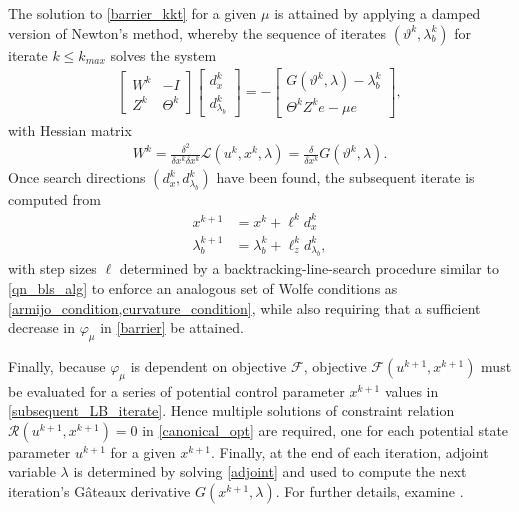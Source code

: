 The solution to \cref{barrier_kkt} for a given $\mu$ is attained by applying a damped version of  Newton's method, whereby the sequence of iterates $(\vartheta^k, \lambda_b^k)$ for iterate $k \leq k_{max}$ solves the system
\begin{align}
  \begin{bmatrix}
   W^k   & - I \\
   Z^k   &   \varTheta^k
  \end{bmatrix}
  \begin{bmatrix}
    d_{x}^k \\
    d_{\lambda_b}^k
  \end{bmatrix} = - 
  \begin{bmatrix}
    G(\vartheta^k,\lambda) - \lambda_b^k \\
    \varTheta^k Z^k e - \mu e
  \end{bmatrix},
\end{align}
with Hessian matrix 
\begin{align}
  W^k = \frac{\delta^2}{\delta x^k \delta x^k} \mathscr{L}(u^k, x^k, \lambda) = \frac{\delta}{\delta x^k} G(\vartheta^k,\lambda).
\end{align}
Once search directions $(d_{x}^k, d_{\lambda_b}^k)$ have been found, the subsequent iterate is computed from
\begin{align}
  \label{subsequent_LB_iterate}
  x^{k+1} &= x^k + \ell^k d_{x}^k \\
  \lambda_b^{k+1} &= \lambda_b^k + \ell_z^k d_{\lambda_b}^k,
\end{align}
with step sizes $\ell$ determined by a backtracking-line-search procedure similar to \cref{qn_bls_alg} to enforce an analogous set of Wolfe conditions as \cref{armijo_condition,curvature_condition}, while also requiring that a sufficient decrease in $\varphi_{\mu}$ in \cref{barrier} be attained.

Finally, because $\varphi_{\mu}$ is dependent on objective $\mathscr{F}$, objective $\mathscr{F}(u^{k+1},x^{k+1})$ must be evaluated for a series of potential control parameter $x^{k+1}$ values in \cref{subsequent_LB_iterate}.  Hence multiple solutions of constraint relation $\mathscr{R}(u^{k+1},x^{k+1}) = 0$ in \cref{canonical_opt} are required, one for each potential state parameter $u^{k+1}$ for a given $x^{k+1}$.  Finally, at the end of each iteration, adjoint variable $\lambda$ is determined by solving \cref{adjoint} and used to compute the next iteration's G\^{a}teaux derivative $G(x^{k+1}, \lambda)$.  For further details, examine \citet{waechter_2006}.

